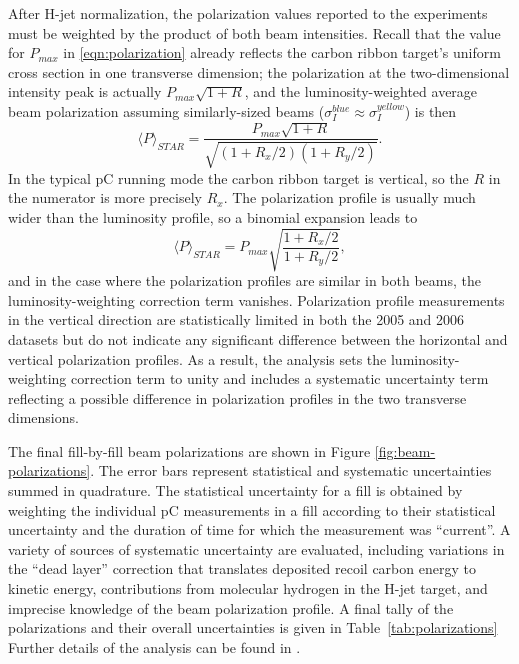 After H-jet normalization, the polarization values reported to the experiments
must be weighted by the product of both beam intensities. Recall that the
value for \(P_{max}\) in \ref{eqn:polarization} already reflects the carbon
ribbon target's uniform cross section in one transverse dimension; the
polarization at the two-dimensional intensity peak is actually
\(P_{max}\sqrt{1+R}\), and the luminosity-weighted average beam polarization
assuming similarly-sized beams (\(\sigma_I^{blue} \approx \sigma_I^{yellow}\))
is then
%
\begin{equation}
  \langle P \rangle_{STAR} = \frac{P_{max} \sqrt{1+R}}{\sqrt{(1+R_x/2)(1+R_y/2)}}.
\end{equation}
%
In the typical pC running mode the carbon ribbon target is vertical, so the
\(R\) in the numerator is more precisely \(R_x\). The polarization profile is
usually much wider than the luminosity profile, so a binomial expansion leads
to
%
\begin{equation}
  \langle P \rangle_{STAR} = P_{max} \sqrt{\frac{1+R_x/2}{1+R_y/2}},
\end{equation}
and in the case where the polarization profiles are similar in both beams, the
luminosity-weighting correction term vanishes. Polarization profile
measurements in the vertical direction are statistically limited in both the
2005 and 2006 datasets but do not indicate any significant difference between
the horizontal and vertical polarization profiles. As a result, the analysis
sets the luminosity-weighting correction term to unity and includes a
systematic uncertainty term reflecting a possible difference in polarization
profiles in the two transverse dimensions.

The final fill-by-fill beam polarizations are shown in Figure
\ref{fig:beam-polarizations}.  The error bars represent statistical and systematic uncertainties summed in quadrature.  The statistical uncertainty for a fill is obtained by weighting the individual pC measurements in a fill according to their statistical uncertainty and the duration of time for which the measurement was ``current''.  A variety of sources of systematic uncertainty are evaluated, including  variations in the ``dead layer'' correction that translates deposited recoil carbon energy to kinetic energy, contributions from molecular hydrogen in the H-jet target, and imprecise knowledge of the beam polarization profile.  A final tally of the polarizations and their overall uncertainties is given in Table~\ref{tab:polarizations}  Further details of the analysis can be found in \cite{CNI05, CNI06}.

